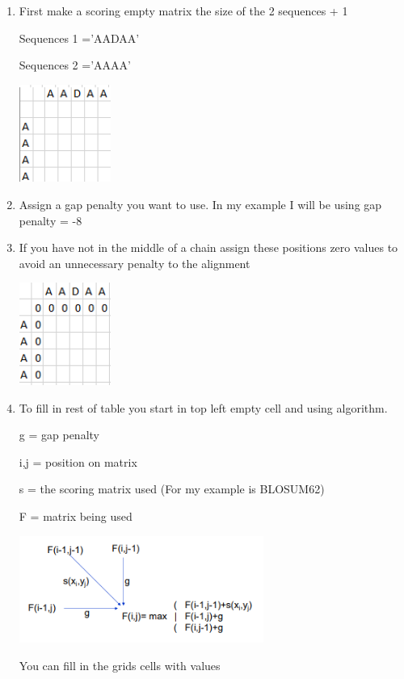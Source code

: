 \documentclass{cmppgr}
\begin{document}
	\begin{enumerate}  
		\item First make a scoring empty matrix the size of the 2 sequences + 1
		
		Sequences 1 ='AADAA'
		
		
		Sequences 2 ='AAAA'
		
		
		\includegraphics[width=3cm]{firstNormal.png}
		
		\item Assign a gap penalty you want to use. In my example I will be using gap penalty = -8
		
		\item If you have not in the middle of a chain assign these positions zero values to avoid an unnecessary penalty to the alignment
		
		\includegraphics[width=3cm]{secondNormal.png}
		
		\item To fill in rest of table you start in top left empty cell and using algorithm.
		
		g 	= gap penalty 
		
		i,j = position on matrix
		
		s	= the scoring matrix used (For my example is BLOSUM62)
		
		F	= matrix being used
		
		\includegraphics[width=8cm]{fillingInNormal.png}
		
		You can fill in the grids cells with values 
		

\end{enumerate}
\end{document}
